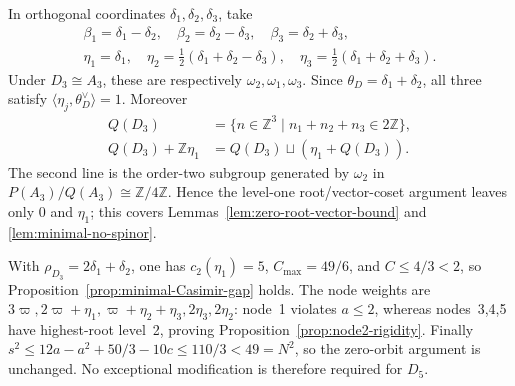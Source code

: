 \documentclass[11pt]{amsart}
\theoremstyle{remark}
\numberwithin{equation}{section}
\begin{document}
In orthogonal coordinates \(\delta_1,\delta_2,\delta_3\), take
\[
\begin{gathered}
 \beta_1=\delta_1-\delta_2,\quad
 \beta_2=\delta_2-\delta_3,\quad
 \beta_3=\delta_2+\delta_3,\\
 \eta_1=\delta_1,\quad
 \eta_2=\tfrac12(\delta_1+\delta_2-\delta_3),\quad
 \eta_3=\tfrac12(\delta_1+\delta_2+\delta_3).
\end{gathered}
\]
Under \(D_3\cong A_3\), these are respectively
\(\omega_2,\omega_1,\omega_3\).  Since
\(\theta_D=\delta_1+\delta_2\), all three satisfy
\(\langle\eta_j,\theta_D^\vee\rangle=1\).  Moreover
\[
\begin{aligned}
 Q(D_3)&=\{n\in\mathbb Z^3\mid n_1+n_2+n_3\in2\mathbb Z\},\\
 Q(D_3)+\mathbb Z\eta_1&=Q(D_3)\sqcup(\eta_1+Q(D_3)).
\end{aligned}
\]
The second line is the order-two subgroup generated by \(\omega_2\) in
\(P(A_3)/Q(A_3)\cong\mathbb Z/4\mathbb Z\).  Hence the level-one
root/vector-coset argument leaves only \(0\) and \(\eta_1\); this covers
Lemmas~\ref{lem:zero-root-vector-bound} and \ref{lem:minimal-no-spinor}.

With \(\rho_{D_3}=2\delta_1+\delta_2\), one has
\(c_2(\eta_1)=5\), \(C_{\max}=49/6\), and \(C\le4/3<2\), so
Proposition~\ref{prop:minimal-Casimir-gap} holds.  The node weights are
\(3\varpi,2\varpi+\eta_1,\varpi+\eta_2+\eta_3,2\eta_3,2\eta_2\): node~1
violates \(a\le2\), whereas nodes~3,4,5 have highest-root level~2, proving
Proposition~\ref{prop:node2-rigidity}.  Finally
\(s^2\le12a-a^2+50/3-10c\le110/3<49=N^2\), so the zero-orbit argument is
unchanged.  No exceptional modification is therefore required for \(D_5\).
\end{document}
